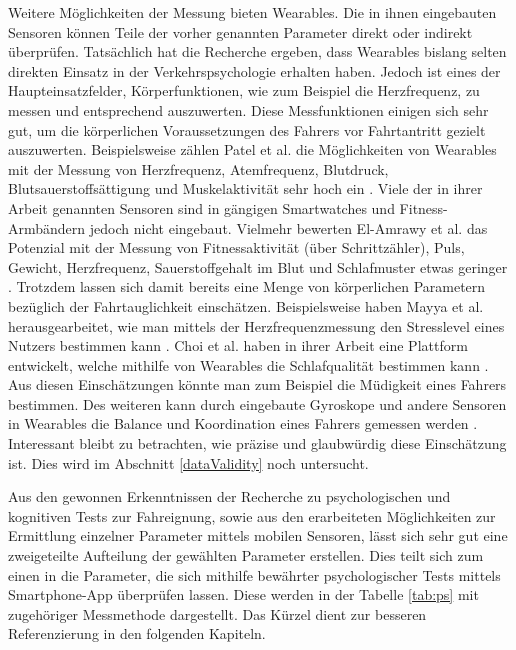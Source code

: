 Weitere Möglichkeiten der Messung bieten Wearables. Die in ihnen eingebauten Sensoren können Teile der vorher genannten Parameter direkt oder indirekt überprüfen. Tatsächlich hat die Recherche ergeben, dass Wearables bislang selten direkten Einsatz in der Verkehrspsychologie erhalten haben. Jedoch ist eines der Haupteinsatzfelder, Körperfunktionen, wie zum Beispiel die Herzfrequenz, zu messen und entsprechend auszuwerten. Diese Messfunktionen einigen sich sehr gut, um die körperlichen Voraussetzungen des Fahrers vor Fahrtantritt gezielt auszuwerten. Beispielsweise zählen Patel et al. die Möglichkeiten von Wearables mit der Messung von Herzfrequenz, Atemfrequenz, Blutdruck, Blutsauerstoffsättigung und Muskelaktivität sehr hoch ein \cite{reviewwearablesensors}. Viele der in ihrer Arbeit genannten Sensoren sind in gängigen Smartwatches und Fitness-Armbändern jedoch nicht eingebaut. Vielmehr bewerten  El-Amrawy et al. das Potenzial mit der Messung von Fitnessaktivität (über Schrittzähler), Puls, Gewicht, Herzfrequenz, Sauerstoffgehalt im Blut und Schlafmuster etwas geringer \cite{wearabletracking}. Trotzdem lassen sich damit bereits eine Menge von körperlichen Parametern bezüglich der Fahrtauglichkeit einschätzen. Beispielsweise haben Mayya et al. herausgearbeitet, wie man mittels der Herzfrequenzmessung den Stresslevel eines Nutzers bestimmen kann \cite{monitoringstressheartrate}. Choi et al. haben in ihrer Arbeit eine Plattform entwickelt, welche mithilfe von Wearables die Schlafqualität bestimmen kann \cite{platformsleepquality}. Aus diesen Einschätzungen könnte man zum Beispiel die Müdigkeit eines Fahrers bestimmen.  Des weiteren kann durch eingebaute Gyroskope und andere Sensoren in Wearables die Balance und Koordination eines Fahrers gemessen werden \cite{balancewearables, smartglasses}.  Interessant bleibt zu betrachten, wie präzise und glaubwürdig diese Einschätzung ist. Dies wird im Abschnitt \ref{dataValidity} noch untersucht.

Aus den gewonnen Erkenntnissen der Recherche zu psychologischen und kognitiven Tests zur Fahreignung, sowie aus den erarbeiteten Möglichkeiten zur Ermittlung einzelner Parameter mittels mobilen Sensoren, lässt sich sehr gut eine zweigeteilte Aufteilung der gewählten Parameter erstellen. Dies teilt sich zum einen in die Parameter, die sich mithilfe bewährter psychologischer Tests mittels Smartphone-App überprüfen lassen. Diese werden in der Tabelle \ref{tab:ps} mit zugehöriger Messmethode dargestellt. Das Kürzel dient zur besseren Referenzierung in den folgenden Kapiteln. 

